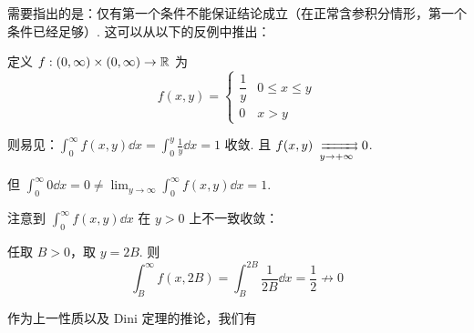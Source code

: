 \begin{hint}
    需要指出的是：仅有第一个条件不能保证结论成立（在正常含参积分情形，第一个条件已经足够）. 这可以从以下的反例中推出：
\end{hint}

\begin{example}
    定义 $f:(0,\infty)\times(0,\infty)\to\mathbb{R}$ 为
$$
f(x,y)=\begin{cases}
    \dfrac{1}{y} & 0\le x\le y\\
    0 & x>y
\end{cases}
$$

    \begin{center}
    \end{center}

    则易见：$\displaystyle\int_0^\infty f(x,y)\dd x=\int_0^y\frac{1}{y}\dd x=1$ 收敛. 且 $f(x,y)\xrightrightarrows[y\to+\infty]{}0$.

    但 $\displaystyle\int_0^\infty 0\dd x=0\ne\lim_{y\to\infty}\int_0^\infty f(x,y)\dd x=1$.

    注意到 $\displaystyle\int_0^\infty f(x,y)\dd x$ 在 $y>0$ 上不一致收敛：

    任取 $B>0$，取 $y=2B$. 则
$$
\int_B^\infty f(x,2B)=\int_B^{2B}\frac{1}{2B}\dd x=\frac{1}{2}\not\to 0
$$
\end{example}

作为上一性质以及 Dini 定理的推论，我们有

